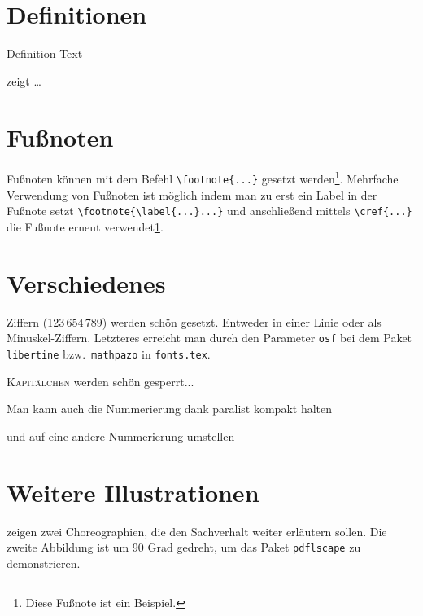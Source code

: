

\section{Definitionen}
\begin{definition}[Title]
\label{def:def1}
Definition Text
\end{definition}

 zeigt \ldots

\section{Fußnoten}
Fußnoten können mit dem Befehl \verb+\footnote{...}+ gesetzt werden\footnote{\label{fussnote}Diese Fußnote ist ein Beispiel.}. Mehrfache Verwendung von Fußnoten ist möglich indem man zu erst ein Label in der Fußnote setzt \verb+\footnote{\label{...}...}+ und anschließend mittels \verb+\cref{...}+ die Fußnote erneut verwendet\cref{fussnote}.

\section{Verschiedenes}
\label{sec:diff}
\ifdeutsch
Ziffern (123\,654\,789) werden schön gesetzt.
Entweder in einer Linie oder als Minuskel-Ziffern.
Letzteres erreicht man durch den Parameter \texttt{osf} bei dem Paket \texttt{libertine} bzw.\ \texttt{mathpazo} in \texttt{fonts.tex}.
\fi

\textsc{Kapitälchen} werden schön gesperrt...

\begin{compactenum}[I.]
\item Man kann auch die Nummerierung dank paralist kompakt halten
\item und auf eine andere Nummerierung umstellen
\end{compactenum}

\section{Weitere Illustrationen}
 zeigen zwei Choreographien, die den Sachverhalt weiter erläutern sollen.
Die zweite Abbildung ist um 90 Grad gedreht, um das Paket \texttt{pdflscape} zu demonstrieren.

